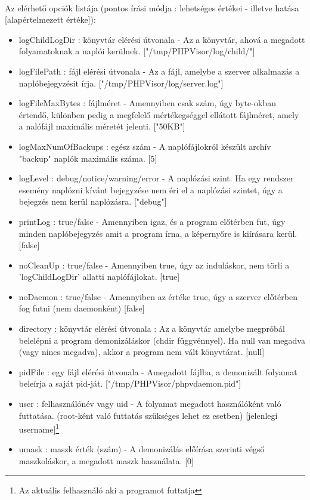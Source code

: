 \documentclass[12pt]{report}
\begin{document}
  \paragraph{}
  Az elérhető opciók listája (pontos írási módja : lehetséges értékei - illetve hatása [alapértelmezett értéke]):
  \begin{itemize}
  \item logChildLogDir : könyvtár elérési útvonala - Az a könyvtár, ahová a megadott folyamatoknak a naplói kerülnek. ["/tmp/PHPVisor/log/child/"]
  \item logFilePath : fájl elérési útvonala - Az a fájl, amelybe a szerver alkalmazás a naplóbejegyzésit írja. ["/tmp/PHPVisor/log/server.log"]
  \item logFileMaxBytes : fájlméret - Amennyiben csak szám, úgy byte-okban értendő, különben pedig a megfelelő mértékegséggel ellátott fájlméret, amely a nalófájl maximális méretét jelenti. ["50KB"]
  \item logMaxNumOfBackups : egész szám - A naplófájlokról készült archív "backup" naplók maximális száma. [5]
  \item logLevel : debug/notice/warning/error - A naplózási szint. Ha egy rendszer esemény naplózni kívánt bejegyzése nem éri el a naplózási szintet, úgy a bejegzés nem kerül naplózásra. ["debug"]
  \item printLog : true/false - Amennyiben igaz, és a program előtérben fut, úgy minden  naplóbejegyzés amit a program írna, a képernyőre is kiírásara kerül. [false]
  \item noCleanUp : true/false - Amennyiben true, úgy az induláskor, nem törli a 'logChildLogDir' allatti naplófájlokat. [true]
  \item noDaemon : true/false - Amennyiben az értéke true, úgy a szerver előtérben fog futni (nem daemonként) [false]
  \item directory : könyvtár elérési útvonala : Az a könyvtár amelybe megpróbál belelépni a program demonizáláskor (chdir függvénnyel). Ha null van megadva (vagy nincs megadva), akkor a program nem vált könyvtárat. [null]
  \item pidFile : egy fájl elérési útvonala - Amegadott fájlba, a demonizált folyamat beleírja a saját pid-ját. ["/tmp/PHPVisor/phpvdaemon.pid"]
  \item user : felhasználónév vagy uid - A folyamat megadott használóként való futtatása. (root-ként való futtatás szükséges lehet ez esetben) [jelenlegi username]\footnote{Az aktuális felhasználó aki a programot futtatja}
  \item umask : maszk érték (szám) - A demonizálás előírása szerinti végső maszkoláskor, a megadott maszk használata. [0]
  \end{itemize}
\end{document}
